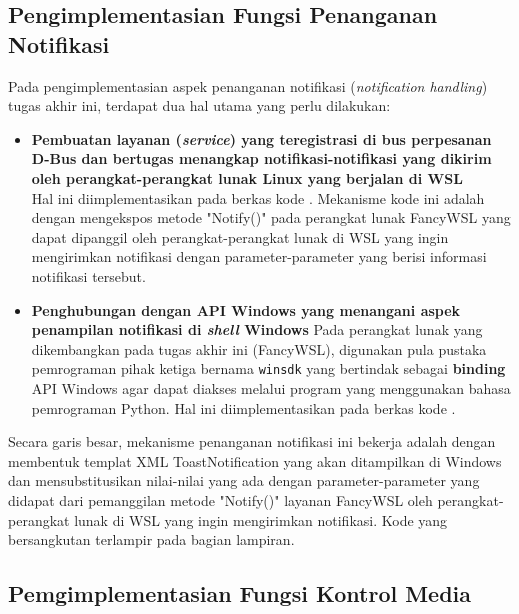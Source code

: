 \subsection{Pengimplementasian Fungsi Penanganan Notifikasi}

Pada pengimplementasian aspek penanganan notifikasi (\textit{notification handling}) tugas akhir ini, terdapat dua hal utama yang perlu dilakukan:
\begin{itemize}
    \item \textbf{Pembuatan layanan (\textit{service}) yang teregistrasi di bus perpesanan D-Bus dan bertugas menangkap notifikasi-notifikasi yang dikirim oleh perangkat-perangkat lunak Linux yang berjalan di WSL}\\
    Hal ini diimplementasikan pada berkas kode . Mekanisme kode ini adalah dengan mengekspos metode "Notify()" pada perangkat lunak FancyWSL yang dapat dipanggil oleh perangkat-perangkat lunak di WSL yang ingin mengirimkan notifikasi dengan parameter-parameter yang berisi informasi notifikasi tersebut.

    \item \textbf{Penghubungan dengan API Windows yang menangani aspek penampilan notifikasi di \textit{shell} Windows}
    Pada perangkat lunak yang dikembangkan pada tugas akhir ini (FancyWSL), digunakan pula pustaka pemrograman pihak ketiga bernama \verb|winsdk| yang bertindak sebagai \textbf{binding} API Windows agar dapat diakses melalui program yang menggunakan bahasa pemrograman Python. Hal ini diimplementasikan pada berkas kode .
\end{itemize}

Secara garis besar, mekanisme penanganan notifikasi ini bekerja adalah dengan membentuk templat XML ToastNotification yang akan ditampilkan di Windows dan mensubstitusikan nilai-nilai yang ada dengan parameter-parameter yang didapat dari pemanggilan metode "Notify()" layanan FancyWSL oleh perangkat-perangkat lunak di WSL yang ingin mengirimkan notifikasi. Kode yang bersangkutan terlampir pada bagian lampiran.

\subsection{Pemgimplementasian Fungsi Kontrol Media}

